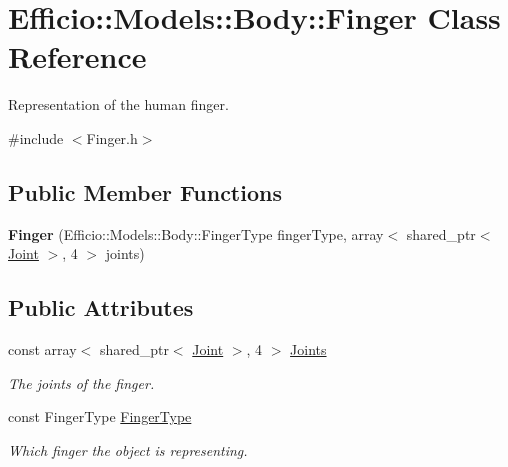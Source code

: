 \hypertarget{class_efficio_1_1_models_1_1_body_1_1_finger}{}\section{Efficio\+:\+:Models\+:\+:Body\+:\+:Finger Class Reference}
\label{class_efficio_1_1_models_1_1_body_1_1_finger}


Representation of the human finger.  




{\ttfamily \#include $<$Finger.\+h$>$}

\subsection*{Public Member Functions}
\begin{DoxyCompactItemize}
\item 
{\bfseries Finger} (Efficio\+::\+Models\+::\+Body\+::\+Finger\+Type finger\+Type, array$<$ shared\+\_\+ptr$<$ \hyperlink{class_efficio_1_1_models_1_1_body_1_1_joint}{Joint} $>$, 4 $>$ joints)\hypertarget{class_efficio_1_1_models_1_1_body_1_1_finger_a228494bff24a9874406ccd9da618eddc}{}\label{class_efficio_1_1_models_1_1_body_1_1_finger_a228494bff24a9874406ccd9da618eddc}

\end{DoxyCompactItemize}
\subsection*{Public Attributes}
\begin{DoxyCompactItemize}
\item 
const array$<$ shared\+\_\+ptr$<$ \hyperlink{class_efficio_1_1_models_1_1_body_1_1_joint}{Joint} $>$, 4 $>$ \hyperlink{class_efficio_1_1_models_1_1_body_1_1_finger_a9940e837998e1b042bce464f129e35d6}{Joints}\hypertarget{class_efficio_1_1_models_1_1_body_1_1_finger_a9940e837998e1b042bce464f129e35d6}{}\label{class_efficio_1_1_models_1_1_body_1_1_finger_a9940e837998e1b042bce464f129e35d6}

\begin{DoxyCompactList}\small\item\em The joints of the finger. \end{DoxyCompactList}\item 
const Finger\+Type \hyperlink{class_efficio_1_1_models_1_1_body_1_1_finger_a463468a5ef7c5023e5bb58fa7a916ad3}{Finger\+Type}\hypertarget{class_efficio_1_1_models_1_1_body_1_1_finger_a463468a5ef7c5023e5bb58fa7a916ad3}{}\label{class_efficio_1_1_models_1_1_body_1_1_finger_a463468a5ef7c5023e5bb58fa7a916ad3}

\begin{DoxyCompactList}\small\item\em Which finger the object is representing. \end{DoxyCompactList}\end{DoxyCompactItemize}


